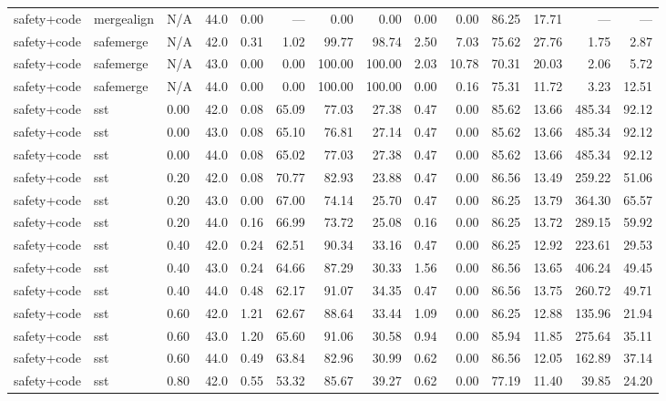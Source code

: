 \documentclass{article}
\begin{document}
\begin{table}[H]
{\begin{tabular}{llllrrrrrrrrrr}
safety+code & mergealign & N/A & 44.0 & 0.00 & --- & 0.00 & 0.00 & 0.00 & 0.00 & 86.25 & 17.71 & --- & --- \\
safety+code & safemerge & N/A & 42.0 & 0.31 & 1.02 & 99.77 & 98.74 & 2.50 & 7.03 & 75.62 & 27.76 & 1.75 & 2.87 \\
safety+code & safemerge & N/A & 43.0 & 0.00 & 0.00 & 100.00 & 100.00 & 2.03 & 10.78 & 70.31 & 20.03 & 2.06 & 5.72 \\
safety+code & safemerge & N/A & 44.0 & 0.00 & 0.00 & 100.00 & 100.00 & 0.00 & 0.16 & 75.31 & 11.72 & 3.23 & 12.51 \\
safety+code & sst & 0.00 & 42.0 & 0.08 & 65.09 & 77.03 & 27.38 & 0.47 & 0.00 & 85.62 & 13.66 & 485.34 & 92.12 \\
safety+code & sst & 0.00 & 43.0 & 0.08 & 65.10 & 76.81 & 27.14 & 0.47 & 0.00 & 85.62 & 13.66 & 485.34 & 92.12 \\
safety+code & sst & 0.00 & 44.0 & 0.08 & 65.02 & 77.03 & 27.38 & 0.47 & 0.00 & 85.62 & 13.66 & 485.34 & 92.12 \\
safety+code & sst & 0.20 & 42.0 & 0.08 & 70.77 & 82.93 & 23.88 & 0.47 & 0.00 & 86.56 & 13.49 & 259.22 & 51.06 \\
safety+code & sst & 0.20 & 43.0 & 0.00 & 67.00 & 74.14 & 25.70 & 0.47 & 0.00 & 86.25 & 13.79 & 364.30 & 65.57 \\
safety+code & sst & 0.20 & 44.0 & 0.16 & 66.99 & 73.72 & 25.08 & 0.16 & 0.00 & 86.25 & 13.72 & 289.15 & 59.92 \\
safety+code & sst & 0.40 & 42.0 & 0.24 & 62.51 & 90.34 & 33.16 & 0.47 & 0.00 & 86.25 & 12.92 & 223.61 & 29.53 \\
safety+code & sst & 0.40 & 43.0 & 0.24 & 64.66 & 87.29 & 30.33 & 1.56 & 0.00 & 86.56 & 13.65 & 406.24 & 49.45 \\
safety+code & sst & 0.40 & 44.0 & 0.48 & 62.17 & 91.07 & 34.35 & 0.47 & 0.00 & 86.56 & 13.75 & 260.72 & 49.71 \\
safety+code & sst & 0.60 & 42.0 & 1.21 & 62.67 & 88.64 & 33.44 & 1.09 & 0.00 & 86.25 & 12.88 & 135.96 & 21.94 \\
safety+code & sst & 0.60 & 43.0 & 1.20 & 65.60 & 91.06 & 30.58 & 0.94 & 0.00 & 85.94 & 11.85 & 275.64 & 35.11 \\
safety+code & sst & 0.60 & 44.0 & 0.49 & 63.84 & 82.96 & 30.99 & 0.62 & 0.00 & 86.56 & 12.05 & 162.89 & 37.14 \\
safety+code & sst & 0.80 & 42.0 & 0.55 & 53.32 & 85.67 & 39.27 & 0.62 & 0.00 & 77.19 & 11.40 & 39.85 & 24.20 \\

\end{tabular}}
\end{table}
\end{document}
